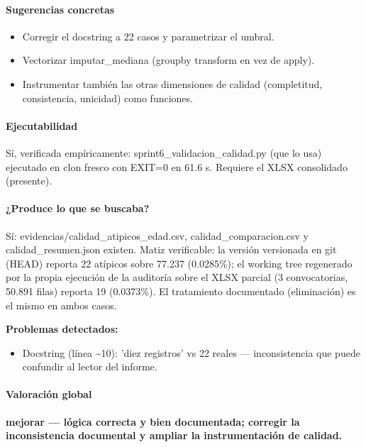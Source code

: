\paragraph{Sugerencias concretas}
\begin{itemize}
  \item Corregir el docstring a 22 casos y parametrizar el umbral.
  \item Vectorizar imputar\_mediana (groupby transform en vez de apply).
  \item Instrumentar también las otras dimensiones de calidad (completitud, consistencia, unicidad) como funciones.
\end{itemize}

\paragraph{Ejecutabilidad}
Sí, verificada empíricamente: sprint6\_validacion\_calidad.py (que lo usa) ejecutado en clon fresco con EXIT=0 en 61.6 s. Requiere el XLSX consolidado (presente).

\paragraph{¿Produce lo que se buscaba?}
Sí: evidencias/calidad\_atipicos\_edad.csv, calidad\_comparacion.csv y calidad\_resumen.json existen. Matiz verificable: la versión versionada en git (HEAD) reporta 22 atípicos sobre 77.237 (0.0285\%); el working tree regenerado por la propia ejecución de la auditoría sobre el XLSX parcial (3 convocatorias, 50.891 filas) reporta 19 (0.0373\%). El tratamiento documentado (eliminación) es el mismo en ambos casos.

\begin{tcolorbox}[riesgo]
\textbf{Problemas detectados:}
\begin{itemize}
  \item Docstring (línea \textasciitilde{}10): 'diez registros' vs 22 reales --- inconsistencia que puede confundir al lector del informe.
\end{itemize}
\end{tcolorbox}

\paragraph{Valoración global}
\textbf{mejorar --- lógica correcta y bien documentada; corregir la inconsistencia documental y ampliar la instrumentación de calidad.}

